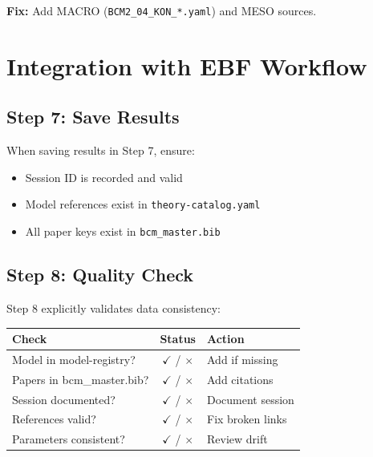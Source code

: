 \textbf{Fix:} Add MACRO (\texttt{BCM2\_04\_KON\_*.yaml}) and MESO sources.

\section{Integration with EBF Workflow}
\label{sec:vc-integration}

\subsection{Step 7: Save Results}

When saving results in Step 7, ensure:
\begin{itemize}
    \item Session ID is recorded and valid
    \item Model references exist in \texttt{theory-catalog.yaml}
    \item All paper keys exist in \texttt{bcm\_master.bib}
\end{itemize}

\subsection{Step 8: Quality Check}

Step 8 explicitly validates data consistency:

\begin{center}
\begin{tabular}{lcl}
\toprule
\textbf{Check} & \textbf{Status} & \textbf{Action} \\
\midrule
Model in model-registry? & $\checkmark$ / $\times$ & Add if missing \\
Papers in bcm\_master.bib? & $\checkmark$ / $\times$ & Add citations \\
Session documented? & $\checkmark$ / $\times$ & Document session \\
References valid? & $\checkmark$ / $\times$ & Fix broken links \\
Parameters consistent? & $\checkmark$ / $\times$ & Review drift \\
\bottomrule
\end{tabular}
\end{center}

